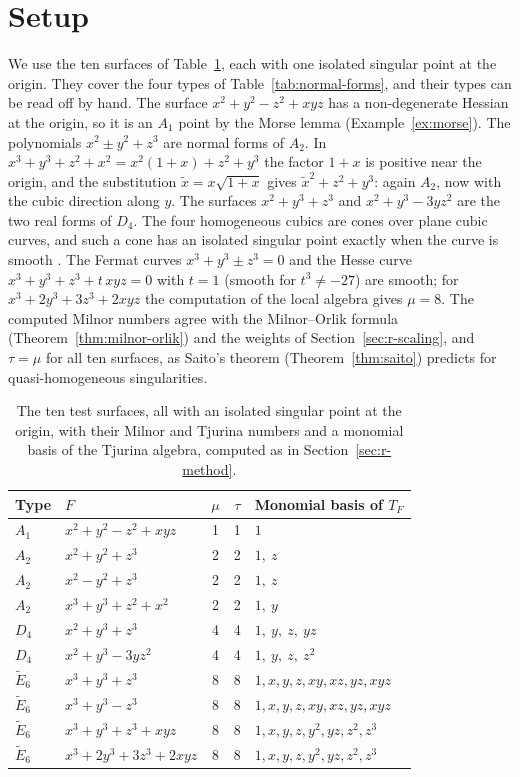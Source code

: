 \documentclass[12pt, a4paper, oneside]{book}
\theoremstyle{plain}
\theoremstyle{definition}
\theoremstyle{remark}
\theoremstyle{definition}
\begin{document}
\section{Setup}
\label{sec:exp-setup}

We use the ten surfaces of Table~\ref{tab:reference-surfaces}, each with one isolated singular point at the origin. They cover the four types of Table~\ref{tab:normal-forms}, and their types can be read off by hand. The surface $x^2+y^2-z^2+xyz$ has a non-degenerate Hessian at the origin, so it is an $A_1$ point by the Morse lemma (Example~\ref{ex:morse}). The polynomials $x^2\pm y^2+z^3$ are normal forms of $A_2$. In $x^3+y^3+z^2+x^2=x^2(1+x)+z^2+y^3$ the factor $1+x$ is positive near the origin, and the substitution $\tilde x=x\sqrt{1+x}$ gives $\tilde x^2+z^2+y^3$: again $A_2$, now with the cubic direction along $y$. The surfaces $x^2+y^3+z^3$ and $x^2+y^3-3yz^2$ are the two real forms of $D_4$. The four homogeneous cubics are cones over plane cubic curves, and such a cone has an isolated singular point exactly when the curve is smooth \cite{dimca1992singularities}. The Fermat curves $x^3+y^3\pm z^3=0$ and the Hesse curve $x^3+y^3+z^3+t\,xyz=0$ with $t=1$ (smooth for $t^3\neq-27$) are smooth; for $x^3+2y^3+3z^3+2xyz$ the computation of the local algebra gives $\mu=8$. The computed Milnor numbers agree with the Milnor--Orlik formula (Theorem~\ref{thm:milnor-orlik}) and the weights of Section~\ref{sec:r-scaling}, and $\tau=\mu$ for all ten surfaces, as Saito's theorem (Theorem~\ref{thm:saito}) predicts for quasi-homogeneous singularities.

\begin{table}[!h]
\centering
\small
\begin{tabular}{l l c c l}
\toprule
Type & $F$ & $\mu$ & $\tau$ & Monomial basis of $T_F$ \\
\midrule
$A_1$ & $x^2+y^2-z^2+xyz$ & 1 & 1 & $1$ \\
$A_2$ & $x^2+y^2+z^3$ & 2 & 2 & $1,\ z$ \\
$A_2$ & $x^2-y^2+z^3$ & 2 & 2 & $1,\ z$ \\
$A_2$ & $x^3+y^3+z^2+x^2$ & 2 & 2 & $1,\ y$ \\
$D_4$ & $x^2+y^3+z^3$ & 4 & 4 & $1,\ y,\ z,\ yz$ \\
$D_4$ & $x^2+y^3-3yz^2$ & 4 & 4 & $1,\ y,\ z,\ z^2$ \\
$\tilde E_6$ & $x^3+y^3+z^3$ & 8 & 8 & $1,x,y,z,xy,xz,yz,xyz$ \\
$\tilde E_6$ & $x^3+y^3-z^3$ & 8 & 8 & $1,x,y,z,xy,xz,yz,xyz$ \\
$\tilde E_6$ & $x^3+y^3+z^3+xyz$ & 8 & 8 & $1,x,y,z,y^2,yz,z^2,z^3$ \\
$\tilde E_6$ & $x^3+2y^3+3z^3+2xyz$ & 8 & 8 & $1,x,y,z,y^2,yz,z^2,z^3$ \\
\bottomrule
\end{tabular}
\caption[Reference surfaces]{The ten test surfaces, all with an isolated singular point at the origin, with their Milnor and Tjurina numbers and a monomial basis of the Tjurina algebra, computed as in Section~\ref{sec:r-method}.}
\label{tab:reference-surfaces}
\end{table}
\end{document}
